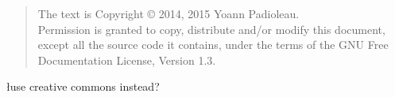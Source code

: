 \begin{quote}
The text is Copyright \copyright{} 2014, 2015 Yoann Padioleau.\\
Permission is granted to copy, distribute and/or modify this document,
except all the source code it contains, under the terms of the GNU Free
Documentation License, Version 1.3.
\end{quote}
\l use creative commons instead?